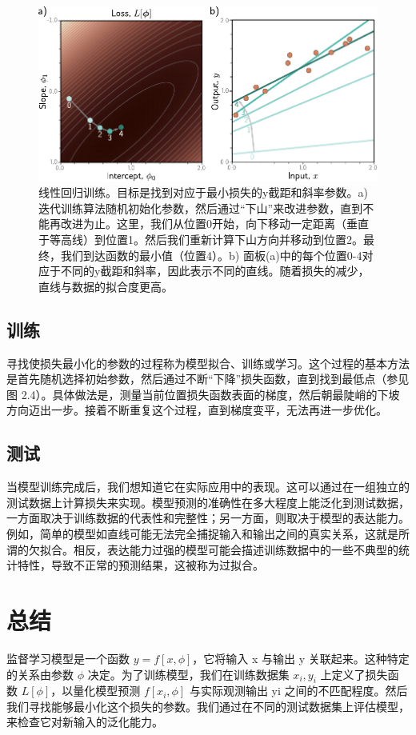 \documentclass[lang=cn,newtx,10pt,scheme=chinese]{elegantbook}
\begin{document}
\begin{figure}
	\centering
	\includegraphics[width=0.7\linewidth]{PDFFigures/UDLChap2PDF/SupervisedOpt.pdf}
	\caption{线性回归训练。目标是找到对应于最小损失的y截距和斜率参数。a) 迭代训练算法随机初始化参数，然后通过“下山”来改进参数，直到不能再改进为止。这里，我们从位置0开始，向下移动一定距离（垂直于等高线）到位置1。然后我们重新计算下山方向并移动到位置2。最终，我们到达函数的最小值（位置4）。b) 面板(a)中的每个位置0-4对应于不同的y截距和斜率，因此表示不同的直线。随着损失的减少，直线与数据的拟合度更高。}
\end{figure}

\subsection{训练}

寻找使损失最小化的参数的过程称为模型拟合、训练或学习。这个过程的基本方法是首先随机选择初始参数，然后通过不断“下降”损失函数，直到找到最低点（参见图 2.4）。具体做法是，测量当前位置损失函数表面的梯度，然后朝最陡峭的下坡方向迈出一步。接着不断重复这个过程，直到梯度变平，无法再进一步优化。

\subsection{测试}

当模型训练完成后，我们想知道它在实际应用中的表现。这可以通过在一组独立的测试数据上计算损失来实现。模型预测的准确性在多大程度上能泛化到测试数据，一方面取决于训练数据的代表性和完整性；另一方面，则取决于模型的表达能力。例如，简单的模型如直线可能无法完全捕捉输入和输出之间的真实关系，这就是所谓的欠拟合。相反，表达能力过强的模型可能会描述训练数据中的一些不典型的统计特性，导致不正常的预测结果，这被称为过拟合。

\section{总结}

监督学习模型是一个函数 $y = f[x, \phi]$，它将输入 x 与输出 y 关联起来。这种特定的关系由参数 \(\phi\) 决定。为了训练模型，我们在训练数据集 {$x_i, y_i$} 上定义了损失函数 $L[\phi]$，以量化模型预测 $f[x_i,\phi]$ 与实际观测输出 yi 之间的不匹配程度。然后我们寻找能够最小化这个损失的参数。我们通过在不同的测试数据集上评估模型，来检查它对新输入的泛化能力。
\end{document}
